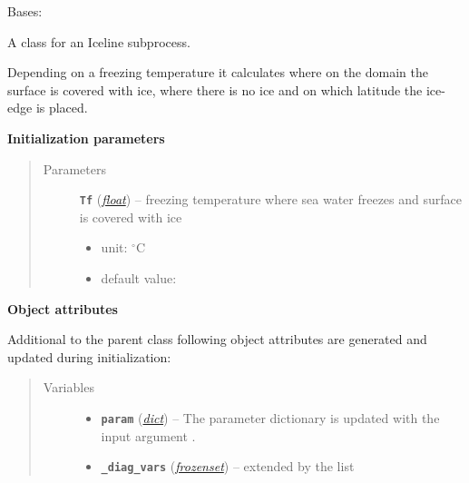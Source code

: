 \documentclass[letterpaper,10pt,english]{sphinxmanual}
\begin{document}
\begin{fulllineitems}
\label{api/climlab.surface:climlab.surface.albedo.Iceline}
Bases: {\hyperref[api/climlab.process:climlab.process.diagnostic.DiagnosticProcess]{\emph{}}}

A class for an Iceline subprocess.

Depending on a freezing temperature it calculates where on the domain the
surface is covered with ice, where there is no ice and on which latitude the ice-edge 
is placed.

\textbf{Initialization parameters}
\begin{quote}\begin{description}
\item[{Parameters}] \leavevmode
\textbf{\texttt{Tf}} (\href{http://docs.python.org/2.7/library/functions.html\#float}{\emph{float}}) -- 
freezing temperature where sea water freezes and
surface is covered with ice
\begin{itemize}
\item {} 
unit: \(^{\circ} \textrm{C}\)

\item {} 
default value: 

\end{itemize}


\end{description}\end{quote}

\textbf{Object attributes}

Additional to the parent class 
{\hyperref[api/climlab.process:climlab.process.diagnostic.DiagnosticProcess]{\emph{}}}
following object attributes are generated and updated during initialization:
\begin{quote}\begin{description}
\item[{Variables}] \leavevmode\begin{itemize}
\item {} 
\textbf{\texttt{param}} (\href{http://docs.python.org/2.7/library/stdtypes.html\#dict}{\emph{dict}}) -- The parameter dictionary is updated with the 
input argument .

\item {} 
\textbf{\texttt{\_diag\_vars}} (\href{http://docs.python.org/2.7/library/stdtypes.html\#frozenset}{\emph{frozenset}}) -- extended by the list 


\end{itemize}
\end{description}
\end{quote}
\end{fulllineitems}
\end{document}
